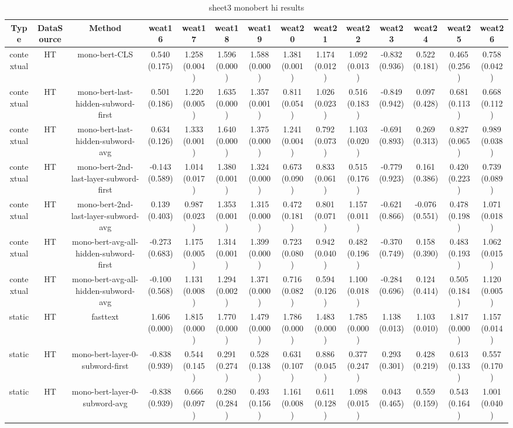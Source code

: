 \begin{sidewaystable}[htb]
    \centering
    \caption{sheet3 monobert hi results}
    \label{appendix_tab:sheet3_monobert_hi_results}
    \small
    \begin{tabular}{@{}cccccccccccccc@{}}
        \toprule
        Type & DataSource & Method & weat16 & weat17 & weat18 & weat19 & weat20 & weat21 & weat22 & weat23 & weat24 & weat25 & weat26 \\
        \midrule
        contextual & HT & mono-bert-CLS & 0.540 (0.175) & 1.258 (0.004) & 1.596 (0.000) & 1.588 (0.000) & 1.381 (0.001) & 1.174 (0.012) & 1.092 (0.013) & -0.832 (0.936) & 0.522 (0.181) & 0.465 (0.256) & 0.758 (0.042) \\
        contextual & HT & mono-bert-last-hidden-subword-first & 0.501 (0.186) & 1.220 (0.005) & 1.635 (0.000) & 1.357 (0.001) & 0.811 (0.054) & 1.026 (0.023) & 0.516 (0.183) & -0.849 (0.942) & 0.097 (0.428) & 0.681 (0.113) & 0.668 (0.112) \\
        contextual & HT & mono-bert-last-hidden-subword-avg & 0.634 (0.126) & 1.333 (0.001) & 1.640 (0.000) & 1.375 (0.000) & 1.241 (0.004) & 0.792 (0.073) & 1.103 (0.020) & -0.691 (0.893) & 0.269 (0.313) & 0.827 (0.065) & 0.989 (0.038) \\
        contextual & HT & mono-bert-2nd-last-layer-subword-first & -0.143 (0.589) & 1.014 (0.017) & 1.380 (0.001) & 1.324 (0.000) & 0.673 (0.090) & 0.833 (0.061) & 0.515 (0.176) & -0.779 (0.923) & 0.161 (0.386) & 0.420 (0.223) & 0.739 (0.089) \\
        contextual & HT & mono-bert-2nd-last-layer-subword-avg & 0.139 (0.403) & 0.987 (0.023) & 1.353 (0.001) & 1.315 (0.000) & 0.472 (0.181) & 0.801 (0.071) & 1.157 (0.011) & -0.621 (0.866) & -0.076 (0.551) & 0.478 (0.198) & 1.071 (0.018) \\
        contextual & HT & mono-bert-avg-all-hidden-subword-first & -0.273 (0.683) & 1.175 (0.005) & 1.314 (0.001) & 1.399 (0.000) & 0.723 (0.080) & 0.942 (0.040) & 0.482 (0.196) & -0.370 (0.749) & 0.158 (0.390) & 0.483 (0.193) & 1.062 (0.015) \\
        contextual & HT & mono-bert-avg-all-hidden-subword-avg & -0.100 (0.568) & 1.131 (0.008) & 1.294 (0.002) & 1.371 (0.000) & 0.716 (0.082) & 0.594 (0.126) & 1.100 (0.018) & -0.284 (0.696) & 0.124 (0.414) & 0.505 (0.184) & 1.120 (0.005) \\
        static & HT & fasttext & 1.606 (0.000) & 1.815 (0.000) & 1.770 (0.000) & 1.479 (0.000) & 1.786 (0.000) & 1.483 (0.000) & 1.785 (0.000) & 1.138 (0.013) & 1.103 (0.010) & 1.817 (0.000) & 1.157 (0.014) \\
        static & HT & mono-bert-layer-0-subword-first & -0.838 (0.939) & 0.544 (0.145) & 0.291 (0.274) & 0.528 (0.138) & 0.631 (0.107) & 0.886 (0.045) & 0.377 (0.247) & 0.293 (0.301) & 0.428 (0.219) & 0.613 (0.133) & 0.557 (0.170) \\
        static & HT & mono-bert-layer-0-subword-avg & -0.838 (0.939) & 0.666 (0.097) & 0.280 (0.284) & 0.493 (0.156) & 1.161 (0.008) & 0.611 (0.128) & 1.098 (0.015) & 0.043 (0.465) & 0.559 (0.159) & 0.543 (0.164) & 1.001 (0.040) \\
        \bottomrule
    \end{tabular}
\end{sidewaystable}